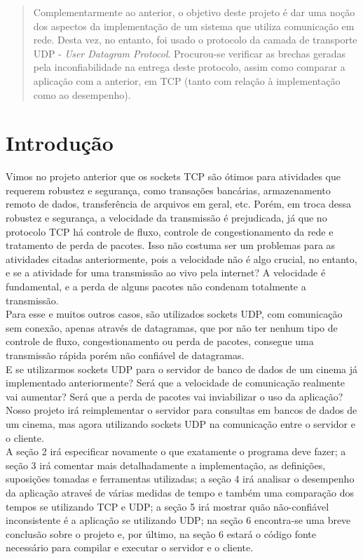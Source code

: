 \documentclass[11pt,twoside]{article}
\begin{document}
\begin{abstract}
Complementarmente ao anterior, o objetivo deste projeto é dar uma noção dos aspectos da implementação de um sistema que utiliza comunicação em rede. Desta vez, no entanto, foi usado o protocolo da camada de transporte UDP - \textit{User Datagram Protocol}. Procurou-se verificar as brechas geradas pela inconfiabilidade na entrega deste protocolo, assim como comparar a aplicação com a anterior, em TCP (tanto com relação à implementação como ao desempenho).
\end{abstract}

\section{Introdução}

Vimos no projeto anterior que os sockets TCP são ótimos para atividades que requerem robustez e segurança, como transações bancárias, armazenamento remoto de dados, transferência de arquivos em geral, etc. Porém, em troca dessa robustez e segurança, a velocidade da transmissão é prejudicada, já que no protocolo TCP há controle de fluxo, controle de congestionamento da rede e tratamento de perda de pacotes. Isso não costuma ser um problemas para as atividades citadas anteriormente, pois a velocidade não é algo crucial, no entanto, e se a atividade for uma transmissão ao vivo pela internet? A velocidade é fundamental, e a perda de alguns pacotes não condenam totalmente a transmissão.\\
Para esse e muitos outros casos, são utilizados sockets UDP, com comunicação sem conexão, apenas através de datagramas, que por não ter nenhum tipo de controle de fluxo, congestionamento ou perda de pacotes, consegue uma transmissão rápida porém não confiável de datagramas.\\
E se utilizarmos sockets UDP para o servidor de banco de dados de um cinema já implementado anteriormente? Será que a velocidade de comunicação realmente vai aumentar? Será que a perda de pacotes vai inviabilizar o uso da aplicação?\\
Nosso projeto irá reimplementar o servidor para consultas em bancos de dados de um cinema, mas agora utilizando sockets UDP na comunicação entre o servidor e o cliente.\\
A seção 2 irá especificar novamente o que exatamente o programa deve fazer; a seção 3 irá comentar mais detalhadamente a implementação, as definições, suposições tomadas e ferramentas utilizadas; a seção 4 irá analisar o desempenho da aplicação atraveś de várias medidas de tempo e também uma comparação dos tempos se utilizando TCP e UDP; a seção 5 irá mostrar quão não-confiável inconsistente é a aplicação se utilizando UDP; na seção 6 encontra-se uma breve conclusão sobre o projeto e, por último, na seção 6 estará o código fonte necessário para compilar e executar o servidor e o cliente.
\end{document}
